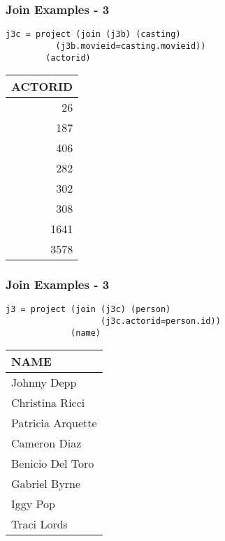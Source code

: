 \documentclass[dvipsnames]{beamer}
\theoremstyle{plain}
\begin{document}
\begin{frame}[fragile]
  \frametitle{Join Examples - 3}

  \begin{example}
    \begin{lstlisting}
j3c = project (join (j3b) (casting)
          (j3b.movieid=casting.movieid))
        (actorid)
    \end{lstlisting}

    \pause
    \begin{tiny}
    \begin{table}
      \begin{tabular}{|r|}\hline
ACTORID\\\hline\hline
     26\\\hline
    187\\\hline
    406\\\hline
    282\\\hline
    302\\\hline
    308\\\hline
   1641\\\hline
   3578\\\hline
      \end{tabular}
    \end{table}
    \end{tiny}
  \end{example}
\end{frame}

\begin{frame}[fragile]
  \frametitle{Join Examples - 3}

  \begin{example}
    \begin{lstlisting}
j3 = project (join (j3c) (person)
                   (j3c.actorid=person.id))
             (name)
    \end{lstlisting}

    \pause
    \begin{tiny}
    \begin{table}
      \begin{tabular}{|l|}\hline
NAME             \\\hline\hline
Johnny Depp      \\\hline
Christina Ricci  \\\hline
Patricia Arquette\\\hline
Cameron Diaz     \\\hline
Benicio Del Toro \\\hline
Gabriel Byrne    \\\hline
Iggy Pop         \\\hline
Traci Lords      \\\hline
      \end{tabular}
    \end{table}
    \end{tiny}
  \end{example}
\end{frame}
\end{document}
